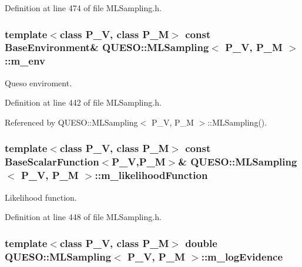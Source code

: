 Definition at line 474 of file M\-L\-Sampling.\-h.

\hypertarget{class_q_u_e_s_o_1_1_m_l_sampling_a13f1ca4fe9f94822fe572a743eaced1d}{
\subsubsection[{m\-\_\-env}]{\setlength{\rightskip}{0pt plus 5cm}template$<$class P\-\_\-\-V, class P\-\_\-\-M$>$ const {\bf Base\-Environment}\& {\bf Q\-U\-E\-S\-O\-::\-M\-L\-Sampling}$<$ P\-\_\-\-V, P\-\_\-\-M $>$\-::m\-\_\-env\hspace{0.3cm}{\ttfamily [private]}}}\label{class_q_u_e_s_o_1_1_m_l_sampling_a13f1ca4fe9f94822fe572a743eaced1d}


Queso enviroment. 



Definition at line 442 of file M\-L\-Sampling.\-h.



Referenced by Q\-U\-E\-S\-O\-::\-M\-L\-Sampling$<$ P\-\_\-\-V, P\-\_\-\-M $>$\-::\-M\-L\-Sampling().

\hypertarget{class_q_u_e_s_o_1_1_m_l_sampling_ab08c3059d23460db49b229aa88bd4e70}{
\subsubsection[{m\-\_\-likelihood\-Function}]{\setlength{\rightskip}{0pt plus 5cm}template$<$class P\-\_\-\-V, class P\-\_\-\-M$>$ const {\bf Base\-Scalar\-Function}$<$P\-\_\-\-V,P\-\_\-\-M$>$\& {\bf Q\-U\-E\-S\-O\-::\-M\-L\-Sampling}$<$ P\-\_\-\-V, P\-\_\-\-M $>$\-::m\-\_\-likelihood\-Function\hspace{0.3cm}{\ttfamily [private]}}}\label{class_q_u_e_s_o_1_1_m_l_sampling_ab08c3059d23460db49b229aa88bd4e70}


Likelihood function. 



Definition at line 448 of file M\-L\-Sampling.\-h.

\hypertarget{class_q_u_e_s_o_1_1_m_l_sampling_afad63c42dccb1518319bf677f2bffde0}{
\subsubsection[{m\-\_\-log\-Evidence}]{\setlength{\rightskip}{0pt plus 5cm}template$<$class P\-\_\-\-V, class P\-\_\-\-M$>$ double {\bf Q\-U\-E\-S\-O\-::\-M\-L\-Sampling}$<$ P\-\_\-\-V, P\-\_\-\-M $>$\-::m\-\_\-log\-Evidence\hspace{0.3cm}{\ttfamily [private]}}}\label{class_q_u_e_s_o_1_1_m_l_sampling_afad63c42dccb1518319bf677f2bffde0}


